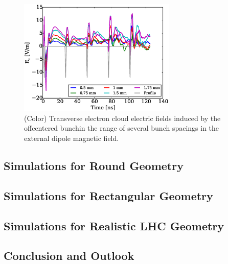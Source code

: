 \documentclass[1p]{elsarticle}%
\begin{document}
\begin{figure}[htb] 
\centering
\includegraphics*[width=75mm]{./data/round_dipole_offset_long.eps}
\caption{(Color) Transverse electron cloud electric fields induced by the offcentered bunchin the range of several bunch spacings in the external dipole magnetic field.}
\label{fig:offset_dipole_long}
\end{figure}



\subsection{Simulations for Round Geometry}

	

\subsection{Simulations for Rectangular Geometry}



\subsection{Simulations for Realistic LHC Geometry}



\subsection{Conclusion and Outlook}

\begin{thebibliography}{16}%


\end{thebibliography}%
\end{document}
